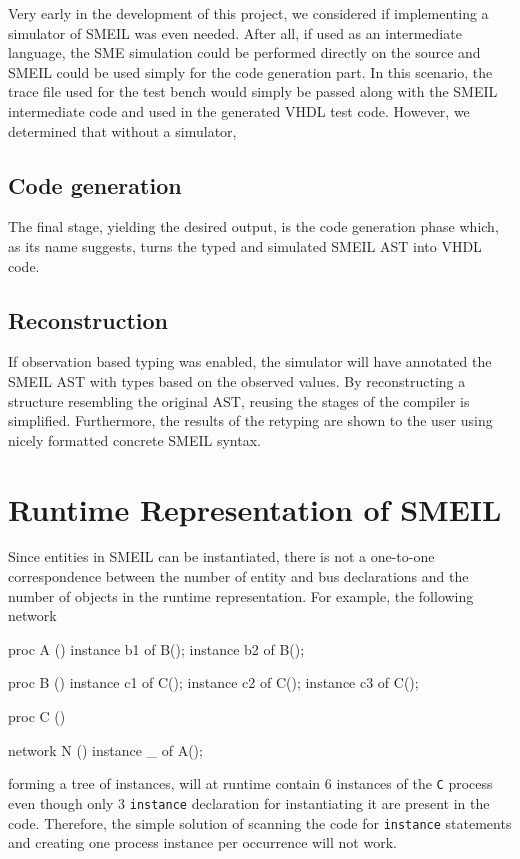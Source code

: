 Very early in the development of this project, we considered if implementing a
simulator of SMEIL was even needed. After all, if used as an intermediate
language, the SME simulation could be performed directly on the source and SMEIL
could be used simply for the code generation part. In this scenario, the trace
file used for the test bench would simply be passed along with the SMEIL
intermediate code and used in the generated VHDL test code. However, we
determined that without a simulator, 

\subsection{Code generation}
The final stage, yielding the desired output, is the code generation phase
which, as its name suggests, turns the typed and simulated SMEIL AST into VHDL
code.
\subsection{Reconstruction} If observation based typing was enabled, the
simulator will have annotated the SMEIL AST with types based on the observed
values. By reconstructing a structure resembling the original AST, reusing the
stages of the compiler is simplified. Furthermore, the results of the retyping
are shown to the user using nicely formatted concrete SMEIL syntax.

\section{Runtime Representation of SMEIL}
Since entities in SMEIL can be instantiated, there is not a one-to-one
correspondence between the number of entity and bus declarations and the number
of objects in the runtime representation. For example, the following network
\begin{smeilcode2}
proc A ()
    instance b1 of B();
    instance b2 of B();
{}

proc B ()
    instance c1 of C();
    instance c2 of C();
    instance c3 of C();
{}

proc C ()
{}

network N () {
    instance _ of A();
}
\end{smeilcode2}
forming a tree of instances, will at runtime contain 6 instances of the {\tt C}
process even though only 3 {\tt instance} declaration for instantiating it are
present in the code. Therefore, the simple solution of scanning the code for
{\tt instance} statements and creating one process instance per occurrence will
not work.

